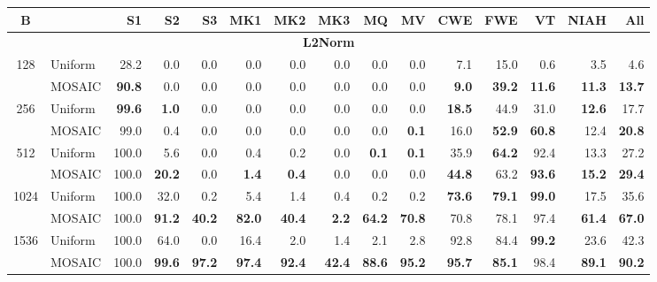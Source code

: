 \begin{table}[tp]
  \centering
  \scriptsize
  \setlength{\tabcolsep}{4pt}
  \renewcommand{\arraystretch}{0.92}
  \begin{tabular}{@{} c l rrrrrrrrrrrrr @{}}
    \toprule
    \textbf{B} & & \textbf{S1} & \textbf{S2} & \textbf{S3} & \textbf{MK1} & \textbf{MK2} & \textbf{MK3} & \textbf{MQ} & \textbf{MV} & \textbf{CWE} & \textbf{FWE} & \textbf{VT} & \textbf{NIAH} & \textbf{All} \\
    \midrule
    \multicolumn{15}{c}{\textbf{L2Norm}} \\
    \midrule
    \multirow{2}{*}{128} & Uniform & 28.2 & 0.0 & 0.0 & 0.0 & 0.0 & 0.0 & 0.0 & 0.0 & 7.1 & 15.0 & 0.6 & 3.5 & 4.6 \\
     & MOSAIC & \textbf{90.8} & 0.0 & 0.0 & 0.0 & 0.0 & 0.0 & 0.0 & 0.0 & \textbf{9.0} & \textbf{39.2} & \textbf{11.6} & \textbf{11.3} & \textbf{13.7} \\
    \cmidrule(l){1-15}
    \multirow{2}{*}{256} & Uniform & \textbf{99.6} & \textbf{1.0} & 0.0 & 0.0 & 0.0 & 0.0 & 0.0 & 0.0 & \textbf{18.5} & 44.9 & 31.0 & \textbf{12.6} & 17.7 \\
     & MOSAIC & 99.0 & 0.4 & 0.0 & 0.0 & 0.0 & 0.0 & 0.0 & \textbf{0.1} & 16.0 & \textbf{52.9} & \textbf{60.8} & 12.4 & \textbf{20.8} \\
    \cmidrule(l){1-15}
    \multirow{2}{*}{512} & Uniform & 100.0 & 5.6 & 0.0 & 0.4 & 0.2 & 0.0 & \textbf{0.1} & \textbf{0.1} & 35.9 & \textbf{64.2} & 92.4 & 13.3 & 27.2 \\
     & MOSAIC & 100.0 & \textbf{20.2} & 0.0 & \textbf{1.4} & \textbf{0.4} & 0.0 & 0.0 & 0.0 & \textbf{44.8} & 63.2 & \textbf{93.6} & \textbf{15.2} & \textbf{29.4} \\
    \cmidrule(l){1-15}
    \multirow{2}{*}{1024} & Uniform & 100.0 & 32.0 & 0.2 & 5.4 & 1.4 & 0.4 & 0.2 & 0.2 & \textbf{73.6} & \textbf{79.1} & \textbf{99.0} & 17.5 & 35.6 \\
     & MOSAIC & 100.0 & \textbf{91.2} & \textbf{40.2} & \textbf{82.0} & \textbf{40.4} & \textbf{2.2} & \textbf{64.2} & \textbf{70.8} & 70.8 & 78.1 & 97.4 & \textbf{61.4} & \textbf{67.0} \\
    \cmidrule(l){1-15}
    \multirow{2}{*}{1536} & Uniform & 100.0 & 64.0 & 0.0 & 16.4 & 2.0 & 1.4 & 2.1 & 2.8 & 92.8 & 84.4 & \textbf{99.2} & 23.6 & 42.3 \\
     & MOSAIC & 100.0 & \textbf{99.6} & \textbf{97.2} & \textbf{97.4} & \textbf{92.4} & \textbf{42.4} & \textbf{88.6} & \textbf{95.2} & \textbf{95.7} & \textbf{85.1} & 98.4 & \textbf{89.1} & \textbf{90.2} \\

\end{tabular}
\end{table}
